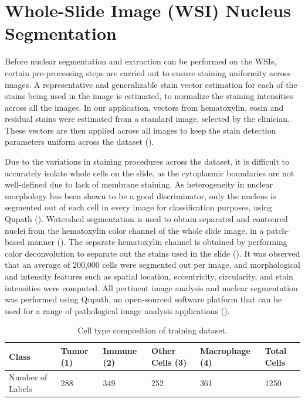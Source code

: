 \documentclass[
]{book}
\begin{document}
\hypertarget{whole-slide-image-wsi-nucleus-segmentation}{%
\section{Whole-Slide Image (WSI) Nucleus Segmentation}\label{whole-slide-image-wsi-nucleus-segmentation}}

Before nuclear segmentation and extraction can be performed on the WSIs, certain pre-processing steps are carried out to ensure staining uniformity across images. A representative and generalizable stain vector estimation for each of the stains being used in the image is estimated, to normalize the staining intensities across all the images. In our application, vectors from hematoxylin, eosin and residual stains were estimated from a standard image, selected by the clinician. These vectors are then applied across all images to keep the stain detection parameters uniform across the dataset (\citet{Bankhead18}).

Due to the variations in staining procedures across the dataset, it is difficult to accurately isolate whole cells on the slide, as the cytoplasmic boundaries are not well-defined due to lack of membrane staining. As heterogeneity in nuclear morphology has been shown to be a good discriminator, only the nucleus is segmented out of each cell in every image for classification purposes, using Qupath (\citet{Yuan12}). Watershed segmentation is used to obtain separated and contoured nuclei from the hematoxylin color channel of the whole slide image, in a patch-based manner (\citet{Bankhead18}). The separate hematoxylin channel is obtained by performing color deconvolution to separate out the stains used in the slide (\citet{Ruifrok01}). It was observed that an average of 200,000 cells were segmented out per image, and morphological and intensity features such as spatial location, eccentricity, circularity, and stain intensities were computed. All pertinent image analysis and nuclear segmentation was performed using Qupath, an open-sourced software platform that can be used for a range of pathological image analysis applications (\citet{Bankhead17}).

\begin{table}

\caption{\label{tab:wsi}Cell type composition of training dataset.}
\centering
\begin{tabular}[t]{l|l|l|l|l|l}
\hline
Class & Tumor (1) & Immune (2) & Other Cells (3) & Macrophage (4) & Total Cells\\
\hline
Number of Labels & 288 & 349 & 252 & 361 & 1250\\
\hline
\end{tabular}
\end{table}
\end{document}
